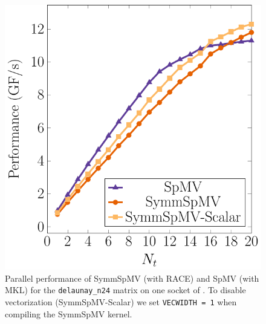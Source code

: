   \begin{figure}[t]
  	\centering
  	\begin{minipage}[c]{0.4\textwidth}
  		\includegraphics[width=\textwidth]{pics/results/scaling_skx/plots/delaunay_n24}
  	\end{minipage}\hfill
  	\begin{minipage}[c]{0.55\textwidth}
  		\caption{Parallel performance  of \acrshort{SymmSpMV} (with \acrshort{RACE})  and \acrshort{SpMV} (with \acrshort{MKL}) for the \texttt{delaunay\_n24} matrix on one socket of \SKX. To disable vectorization (SymmSpMV-Scalar) we set \texttt{VECWIDTH = 1} when compiling the \acrshort{SymmSpMV} kernel.}
  		\label{fig:scaling_delaunay}
  	\end{minipage}
  \end{figure}
%

